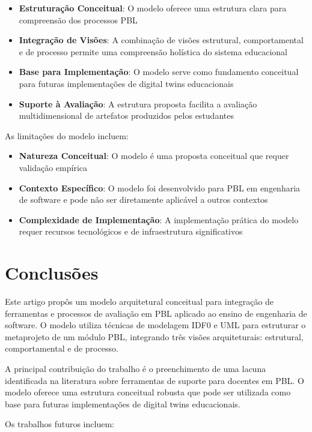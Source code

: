 \documentclass[english, spanish, brazilian]{RBIEarticle} %
\begin{document}
\begin{itemize}
    \item \textbf{Estruturação Conceitual}: O modelo oferece uma estrutura clara para compreensão dos processos PBL
    \item \textbf{Integração de Visões}: A combinação de visões estrutural, comportamental e de processo permite uma compreensão holística do sistema educacional
    \item \textbf{Base para Implementação}: O modelo serve como fundamento conceitual para futuras implementações de digital twins educacionais
    \item \textbf{Suporte à Avaliação}: A estrutura proposta facilita a avaliação multidimensional de artefatos produzidos pelos estudantes
\end{itemize}

As limitações do modelo incluem:

\begin{itemize}
    \item \textbf{Natureza Conceitual}: O modelo é uma proposta conceitual que requer validação empírica
    \item \textbf{Contexto Específico}: O modelo foi desenvolvido para PBL em engenharia de software e pode não ser diretamente aplicável a outros contextos
    \item \textbf{Complexidade de Implementação}: A implementação prática do modelo requer recursos tecnológicos e de infraestrutura significativos
\end{itemize}

\section{Conclusões}

Este artigo propôs um modelo arquitetural conceitual para integração de ferramentas e processos de avaliação em PBL aplicado ao ensino de engenharia de software. O modelo utiliza técnicas de modelagem IDF0 e UML para estruturar o metaprojeto de um módulo PBL, integrando três visões arquiteturais: estrutural, comportamental e de processo.

A principal contribuição do trabalho é o preenchimento de uma lacuna identificada na literatura sobre ferramentas de suporte para docentes em PBL. O modelo oferece uma estrutura conceitual robusta que pode ser utilizada como base para futuras implementações de digital twins educacionais.

Os trabalhos futuros incluem:
\end{document}

